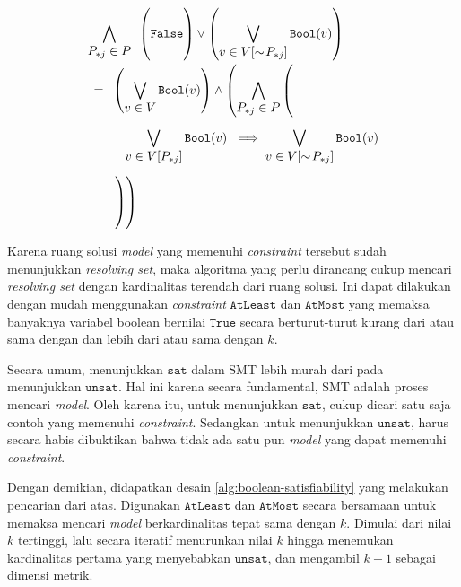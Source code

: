 \documentclass[10pt,twocolumn]{article}
\newcommand{\foreign}[1]{\foreignlanguage{english}{\textit{#1}}}
\def\True{\mathtt{True}}
\def\False{\mathtt{False}}
\def\AtLeast{\mathtt{AtLeast}}
\def\AtMost{\mathtt{AtMost}}
\def\boolmap{\mathtt{Bool}}
\newcommand{\combine}[7]{#1 #2 \vphantom{#6} #3 #4 #5 #6 \vphantom{#2} #7}
\def\sat{\mathtt{sat}}
\def\unsat{\mathtt{unsat}}
\begin{document}
\begin{equation}
	\begin{array}{l}
		\displaystyle \bigwedge \limits_{\displaystyle P_{*j} \in P} \enspace \combine{\left(}{\False}{\right)}{\vee}{\left(}{\bigvee \limits_{\displaystyle v \in V[\sim\!P_{*j}]} \boolmap(v)}{\right)} \\ [18pt]
		\displaystyle \enspace = \enspace \left( \bigvee \limits_{\displaystyle v \in V} \boolmap(v) \right) \wedge \left( \bigwedge \limits_{\displaystyle P_{*j} \in P} \left( \vphantom{\bigvee \limits_{\displaystyle V[]}} \right. \right. \\ [24pt]
		\displaystyle \qquad \quad \bigvee \limits_{\displaystyle v \in V[P_{*j}]} \boolmap(v)\ \implies \bigvee \limits_{\displaystyle v \in V[\sim\!P_{*j}]} \boolmap(v) \\ [24pt]
		\displaystyle \phantom{\enspace = \enspace} \left. \left. \vphantom{\bigvee \limits_{\displaystyle V[]}} \right) \right)
	\end{array}
	\label{eq:boolean-satisfiability}
\end{equation}

Karena ruang solusi \foreign{model} yang memenuhi \foreign{constraint} tersebut sudah menunjukkan \foreign{resolving set}, maka algoritma yang perlu dirancang cukup mencari \foreign{resolving set} dengan kardinalitas terendah dari ruang solusi. Ini dapat dilakukan dengan mudah menggunakan \foreign{constraint} \(\AtLeast\) dan \(\AtMost\) yang memaksa banyaknya variabel boolean bernilai \(\True\) secara berturut-turut kurang dari atau sama dengan dan lebih dari atau sama dengan \(k\).

Secara umum, menunjukkan \(\sat\) dalam SMT lebih murah dari pada menunjukkan \(\unsat\). Hal ini karena secara fundamental, SMT adalah proses mencari \foreign{model}. Oleh karena itu, untuk menunjukkan \(\sat\), cukup dicari satu saja contoh yang memenuhi \foreign{constraint}. Sedangkan untuk menunjukkan \(\unsat\), harus secara habis dibuktikan bahwa tidak ada satu pun \foreign{model} yang dapat memenuhi \foreign{constraint}.

Dengan demikian, didapatkan desain \autoref{alg:boolean-satisfiability} yang melakukan pencarian dari atas. Digunakan \(\AtLeast\) dan \(\AtMost\) secara bersamaan untuk memaksa mencari \foreign{model} berkardinalitas tepat sama dengan \(k\). Dimulai dari nilai \(k\) tertinggi, lalu secara iteratif menurunkan nilai \(k\) hingga menemukan kardinalitas pertama yang menyebabkan \(\unsat\), dan mengambil \(k + 1\) sebagai dimensi metrik.
\end{document}
